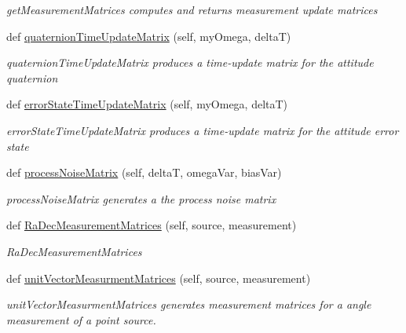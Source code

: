 \begin{DoxyCompactItemize}
\begin{DoxyCompactList}\small\item\em get\+Measurement\+Matrices computes and returns measurement update matrices \end{DoxyCompactList}\item 
def \hyperlink{classmodest_1_1substates_1_1attitude_1_1Attitude_ae21ed62061b674b0108f205df2122083}{quaternion\+Time\+Update\+Matrix} (self, my\+Omega, deltaT)
\begin{DoxyCompactList}\small\item\em quaternion\+Time\+Update\+Matrix produces a time-\/update matrix for the attitude quaternion \end{DoxyCompactList}\item 
def \hyperlink{classmodest_1_1substates_1_1attitude_1_1Attitude_a06165c15ac5d7422a7bcd1e3f7ac24e7}{error\+State\+Time\+Update\+Matrix} (self, my\+Omega, deltaT)
\begin{DoxyCompactList}\small\item\em error\+State\+Time\+Update\+Matrix produces a time-\/update matrix for the attitude error state \end{DoxyCompactList}\item 
def \hyperlink{classmodest_1_1substates_1_1attitude_1_1Attitude_a11f6e9a0803c6843d7c89061ffbb3c2c}{process\+Noise\+Matrix} (self, deltaT, omega\+Var, bias\+Var)
\begin{DoxyCompactList}\small\item\em process\+Noise\+Matrix generates a the process noise matrix \end{DoxyCompactList}\item 
def \hyperlink{classmodest_1_1substates_1_1attitude_1_1Attitude_a7b095e94e776bfc84b1ee3efe589e024}{Ra\+Dec\+Measurement\+Matrices} (self, source, measurement)
\begin{DoxyCompactList}\small\item\em Ra\+Dec\+Measurement\+Matrices \end{DoxyCompactList}\item 
def \hyperlink{classmodest_1_1substates_1_1attitude_1_1Attitude_a64a5d1ac99db8b5badc3baf1f101ad7d}{unit\+Vector\+Measurment\+Matrices} (self, source, measurement)
\begin{DoxyCompactList}\small\item\em unit\+Vector\+Measurment\+Matrices generates measurement matrices for a angle measurement of a point source. \end{DoxyCompactList}\item 

\end{DoxyCompactItemize}
